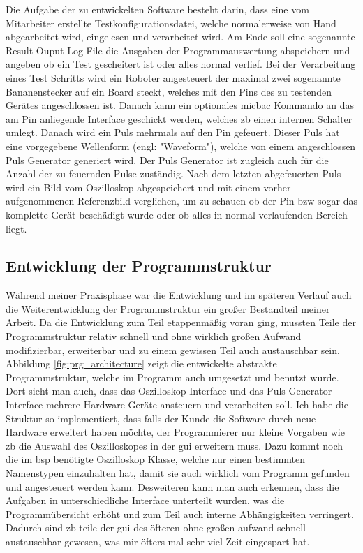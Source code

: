 Die Aufgabe der zu entwickelten Software besteht darin, dass eine vom Mitarbeiter erstellte Testkonfigurationsdatei, welche normalerweise von Hand abgearbeitet wird, eingelesen und verarbeitet wird. Am Ende soll eine sogenannte Result Ouput Log File die Ausgaben der Programmauswertung abspeichern und angeben ob ein Test gescheitert ist oder alles normal verlief.
Bei der Verarbeitung eines Test Schritts wird ein Roboter angesteuert der maximal zwei sogenannte Bananenstecker auf ein Board steckt, welches mit den Pins des zu testenden Gerätes angeschlossen ist. Danach kann ein optionales \ac{micbac} Kommando an das am Pin anliegende Interface geschickt werden, welches \ac{zb} einen internen Schalter umlegt. Danach wird ein Puls mehrmals auf den Pin gefeuert. Dieser Puls hat eine vorgegebene Wellenform (engl: "Waveform"), welche von einem angeschlossen Puls Generator generiert wird. Der Puls Generator ist zugleich auch für die Anzahl der zu feuernden Pulse zuständig. Nach dem letzten abgefeuerten Puls wird ein Bild vom Oszilloskop abgespeichert und mit einem vorher aufgenommenen Referenzbild verglichen, um zu schauen ob der Pin \ac{bzw} sogar das komplette Gerät beschädigt wurde oder ob alles in normal verlaufenden Bereich liegt. 


\subsection{Entwicklung der Programmstruktur}
\label{subsec:entw-prgstr}

Während meiner Praxisphase war die Entwicklung und im späteren Verlauf auch die Weiterentwicklung der Programmstruktur ein großer Bestandteil meiner Arbeit. Da die Entwicklung zum Teil etappenmäßig voran ging, mussten Teile der Programmstruktur relativ schnell und ohne wirklich großen Aufwand modifizierbar, erweiterbar und zu einem gewissen Teil auch austauschbar sein. Abbildung \ref{fig:prg_architecture} zeigt die entwickelte abstrakte Programmstruktur, welche im Programm auch umgesetzt und benutzt wurde. Dort sieht man auch, dass das Oszilloskop Interface und das Puls-Generator Interface mehrere Hardware Geräte ansteuern und verarbeiten soll. Ich habe die Struktur so implementiert, dass falls der Kunde die Software durch neue Hardware erweitert haben möchte, der Programmierer nur kleine Vorgaben wie \ac{zb} die Auswahl des Oszilloskopes in der \ac{gui} erweitern muss. Dazu kommt noch die im \ac{bsp} benötigte Oszilloskop Klasse, welche nur einen bestimmten Namenstypen einzuhalten hat, damit sie auch wirklich vom Programm gefunden und angesteuert werden kann. Desweiteren kann man auch erkennen, dass die Aufgaben in unterschiedliche Interface unterteilt wurden, was die Programmübersicht erhöht und zum Teil auch interne Abhängigkeiten verringert. Dadurch sind \ac{zb} teile der \ac{gui} des öfteren ohne großen aufwand schnell austauschbar gewesen, was mir öfters mal sehr viel Zeit eingespart hat.

